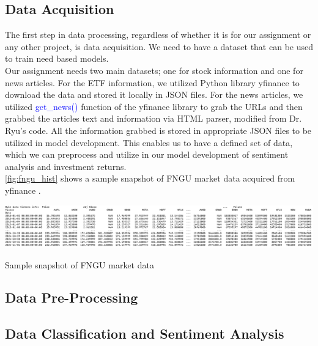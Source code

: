\documentclass[twocolumn,10pt]{article}
\makeatletter
\newenvironment{figurehere}
  {\def\@captype{figure}}
  {}
\makeatother
\begin{document}
\begin{multicols}{2}
\begin{flushleft}
	\subsection{Data Acquisition} \label{data_acquisition}
	The first step in data processing, regardless of whether it is for our assignment or any other project, is data acquisition. We need to have a dataset that can be used to train need based models.\\
	Our assignment needs two main datasets; one for stock information and one for news articles. For the ETF information, we utilized Python library yfinance \cite{yfin} to download the data and stored it locally in JSON files. For the news articles, we utilized \textcolor{blue}{get\_news()} function of the yfinance library \cite{yfin} to grab the URLs and then grabbed the articles text and information via HTML parser, modified from Dr. Ryu's \cite{cryu} code. All the information grabbed is stored in appropriate JSON files to be utilized in model development. This enables us to have a defined set of data, which we can preprocess and utilize in our model development of sentiment analysis and investment returns.\\
	
	\cref{fig:fngu_hist} shows a sample snapshot of FNGU market data acquired from yfinance \cite{yfin}.
	
	\begin{figurehere}
		\centering
		\includegraphics[width=\linewidth]{images/fngu_hist.png}
		\caption{Sample snapshot of FNGU market data}
		\label{fig:fngu_hist}
	\end{figurehere}
	
	\subsection{Data Pre-Processing} \label{data_preprocessing}
			
	\subsection{Data Classification and Sentiment Analysis} \label{class_model_analysis}
	

\end{flushleft}
\end{multicols}
\end{document}

